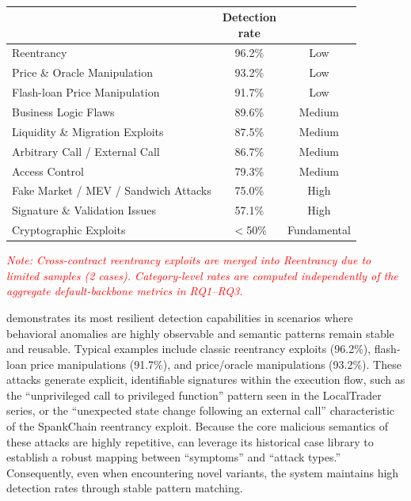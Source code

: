 \begin{table}[t]
	\centering
	\caption{}
	\label{tab:capability_spectrum}
	\small
\setlength{\tabcolsep}{3pt}
	\begin{tabular}{@{}>{\raggedright\arraybackslash}p{}cc@{}}
		\toprule
		\text{Type} & \makecell{Detection\\rate} & \text{Difficulty} \\
		\midrule
		Reentrancy & 96.2\% & Low \\
        Price \& Oracle Manipulation & 93.2\% & Low \\
		Flash-loan Price Manipulation & 91.7\% & Low \\
		Business Logic Flaws & 89.6\% & Medium \\
		Liquidity \& Migration Exploits & 87.5\% & Medium \\
		Arbitrary Call / External Call & 86.7\% & Medium \\
		Access Control & 79.3\% & Medium \\
		Fake Market / MEV / Sandwich Attacks & 75.0\% & High \\
		Signature \& Validation Issues & 57.1\% & High \\
		Cryptographic Exploits  & $<$50\% & Fundamental \\
		\bottomrule
	\end{tabular}
	
	\smallskip\scriptsize\textit{\textcolor{red}{Note: Cross-contract reentrancy exploits are merged into Reentrancy due to limited samples (2 cases). Category-level rates are computed independently of the aggregate default-backbone metrics in RQ1--RQ3.}}
\end{table}


\approach{} demonstrates its most resilient detection capabilities in scenarios where behavioral anomalies are highly observable and semantic patterns remain stable and reusable. Typical examples include classic reentrancy exploits (96.2\%), flash-loan price manipulations (91.7\%), and price/oracle manipulations (93.2\%). These attacks generate explicit, identifiable signatures within the execution flow, such as the ``unprivileged call to privileged function'' pattern seen in the LocalTrader series, or the ``unexpected state change following an external call'' characteristic of the SpankChain reentrancy exploit. Because the core malicious semantics of these attacks are highly repetitive, \approach{} can leverage its historical case library to establish a robust mapping between ``symptoms'' and ``attack types.'' Consequently, even when encountering novel variants, the system maintains high detection rates through stable pattern matching.

